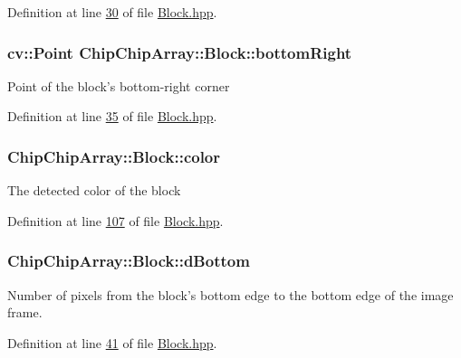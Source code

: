 Definition at line \hyperlink{Block_8hpp_source_l00030}{30} of file \hyperlink{Block_8hpp_source}{Block.\+hpp}.

\hypertarget{classChipChipArray_1_1Block_a82f831883d31e6d74be45b8851eefe96}{
\subsubsection[{bottom\+Right}]{\setlength{\rightskip}{0pt plus 5cm}cv\+::\+Point Chip\+Chip\+Array\+::\+Block\+::bottom\+Right}}\label{classChipChipArray_1_1Block_a82f831883d31e6d74be45b8851eefe96}
Point of the block's bottom-\/right corner 

Definition at line \hyperlink{Block_8hpp_source_l00035}{35} of file \hyperlink{Block_8hpp_source}{Block.\+hpp}.

\hypertarget{classChipChipArray_1_1Block_a262210a9a04028f3f2670c9ae38ef3d7}{
\subsubsection[{color}]{ Chip\+Chip\+Array\+::\+Block\+::color}}\label{classChipChipArray_1_1Block_a262210a9a04028f3f2670c9ae38ef3d7}
The detected color of the block 

Definition at line \hyperlink{Block_8hpp_source_l00107}{107} of file \hyperlink{Block_8hpp_source}{Block.\+hpp}.

\hypertarget{classChipChipArray_1_1Block_af3c4ecd0fd36763ac85c2dc0b57b8359}{
\subsubsection[{d\+Bottom}]{ Chip\+Chip\+Array\+::\+Block\+::d\+Bottom}}\label{classChipChipArray_1_1Block_af3c4ecd0fd36763ac85c2dc0b57b8359}
Number of pixels from the block's bottom edge to the bottom edge of the image frame. 

Definition at line \hyperlink{Block_8hpp_source_l00041}{41} of file \hyperlink{Block_8hpp_source}{Block.\+hpp}.

